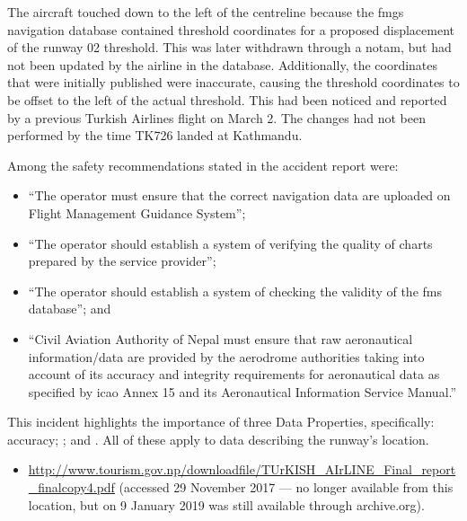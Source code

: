 The aircraft touched down to the left of the centreline because the \gls{fmgs} navigation \gls{database} contained threshold coordinates for a proposed displacement of the runway 02 threshold. This was later withdrawn through a \gls{notam}, but had not been updated by the airline in the \gls{database}. Additionally, the coordinates that were initially published were inaccurate, causing the threshold coordinates to be offset to the left of the actual threshold. This had been noticed and reported by a previous Turkish Airlines flight on March 2. The changes had not been performed by the time TK726 landed at Kathmandu. 

Among the safety recommendations stated in the accident report were:
\begin{itemize}
  \item ``The operator must ensure that the correct navigation data are uploaded on Flight Management Guidance System''; 
  \item ``The operator should establish a system of verifying the quality of charts prepared by the service provider''; 
  \item ``The operator should establish a system of checking the validity of the \gls{fms} \gls{database}''; and
  \item ``Civil Aviation Authority of Nepal must ensure that raw aeronautical information/data are provided by the aerodrome authorities taking into account of its accuracy and integrity requirements for \gls{aeronautical data} as specified by \gls{icao} Annex 15 and its Aeronautical Information Service Manual.''
\end{itemize}

This incident highlights the importance of three Data Properties, specifically: \gls{accuracy}; ; and . All of these apply to data describing the runway's location.

\begin{samepage}
\begin{itemize}
  \item \raggedright{\href{https://web.archive.org/web/20170709044727/http://www.tourism.gov.np/downloadfile/TUrKISH_AIrLINE_Final_report_finalcopy4.pdf}{http://www.tourism.gov.np/downloadfile/TUrKISH\_AIrLINE\_Final\_report\_finalcopy4.pdf} (accessed 29 November 2017 --- no longer available from this location, but on 9 January 2019 was still available through archive.org).}
\end{itemize}
\end{samepage}


